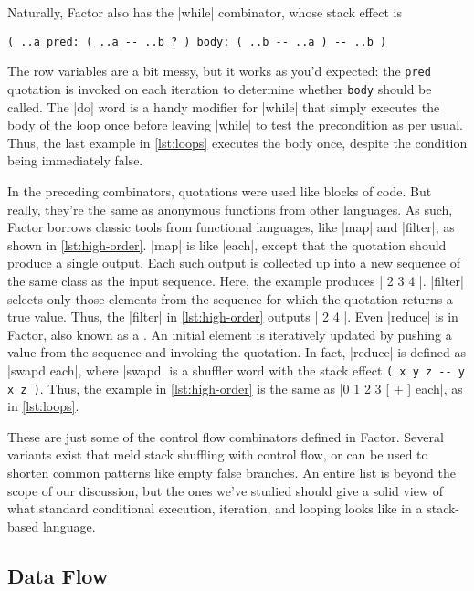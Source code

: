 Naturally, Factor also has the \factor|while| combinator, whose stack effect is
%
\begin{center}
%
  \Verb|( ..a pred: ( ..a -- ..b ? ) body: ( ..b -- ..a ) -- ..b )|
%
\end{center}
%
\noindent The row variables are a bit messy, but it works as you'd expected:
the \Verb|pred| quotation is invoked on each iteration to determine whether
\Verb|body| should be called.  The \factor|do| word is a handy modifier for
\factor|while| that simply executes the body of the loop once before leaving
\factor|while| to test the precondition as per usual.  Thus, the last example
in \cref{lst:loops} executes the body once, despite the condition being
immediately false.


In the preceding combinators, quotations were used like blocks of code.  But
really, they're the same as anonymous functions from other languages.  As such,
Factor borrows classic tools from functional languages, like \factor|map| and
\factor|filter|, as shown in \cref{lst:high-order}.  \factor|map| is like
\factor|each|, except that the quotation should produce a single output.  Each
such output is collected up into a new sequence of the same class as the input
sequence.  Here, the example produces
%
\factor|{ 2 3 4 }|.
%
\factor|filter| selects only those elements from the sequence for which the
quotation returns a true value.  Thus, the \factor|filter| in
\cref{lst:high-order} outputs
%
\factor|{ 2 4 }|.
%
Even \factor|reduce| is in Factor, also known as a .  An
initial element is iteratively updated by pushing a value from the sequence and
invoking the quotation.  In fact, \factor|reduce| is defined as
%
\factor|swapd each|,
%
where \factor|swapd| is a shuffler word with the stack effect
%
\Verb|( x y z -- y x z )|.
%
Thus, the example in \cref{lst:high-order} is the same as
%
\factor|0 { 1 2 3 } [ + ] each|,
%
as in \cref{lst:loops}.

These are just some of the control flow combinators defined in Factor.  Several
variants exist that meld stack shuffling with control flow, or can be used to
shorten common patterns like empty false branches.  An entire list is beyond
the scope of our discussion, but the ones we've studied should give a solid
view of what standard conditional execution, iteration, and looping looks like
in a stack-based language.

\subsection{Data Flow}\label{sec:primer:data-flow}

